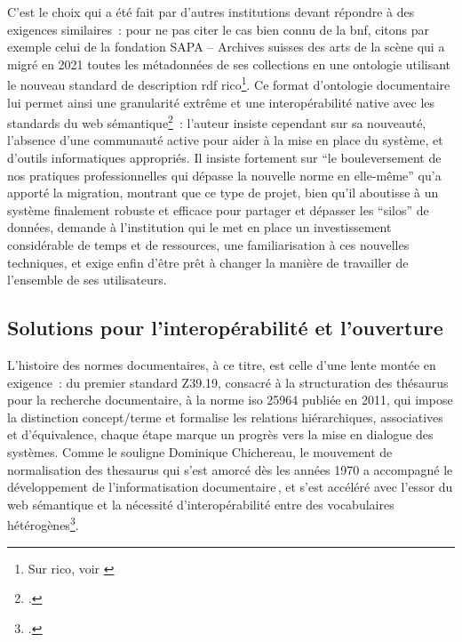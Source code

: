 C'est le choix qui a été fait par d'autres institutions devant répondre à des exigences similaires~: pour ne pas citer le cas bien connu de la \ac{bnf}, citons par exemple celui de la fondation SAPA -- Archives suisses des arts de la scène qui a migré en 2021 toutes les métadonnées de ses collections en une ontologie utilisant le nouveau standard de description \ac{rdf} \ac{rico}\footnote{Sur \ac{rico}, voir \cite{bruleauxRecordsContextsRIC2024}}. Ce format d'ontologie documentaire lui permet ainsi une granularité extrême et une interopérabilité native avec les standards du web sémantique\footcite{coulonDeploiementNormeRecords2024}~: l'auteur insiste cependant sur sa nouveauté, l'absence d'une communauté active pour aider à la mise en place du système, et d'outils informatiques appropriés. Il insiste fortement sur \enquote{le bouleversement de nos pratiques professionnelles qui dépasse la nouvelle norme en elle-même} qu'a apporté la migration, montrant que ce type de projet, bien qu'il aboutisse à un système finalement robuste et efficace pour partager et dépasser les \enquote{silos} de données, demande à l'institution qui le met en place un investissement considérable de temps et de ressources, une familiarisation à ces nouvelles techniques, et exige enfin d'être prêt à changer la manière de travailler de l'ensemble de ses utilisateurs.

\subsection{Solutions pour l’interopérabilité et l’ouverture}


L’histoire des normes documentaires, à ce titre, est celle d’une lente montée en exigence~: du premier standard Z39.19, consacré à la structuration des thésaurus pour la recherche documentaire, à la norme \gls{iso} 25964 publiée en 2011, qui impose la distinction concept/terme et formalise les relations hiérarchiques, associatives et d’équivalence, chaque étape marque un progrès vers la mise en dialogue des systèmes. Comme le souligne Dominique Chichereau, le mouvement de normalisation des \gls{thesaurus} qui s'est amorcé dès les années 1970 a accompagné le développement de l’informatisation documentaire , et s’est accéléré avec l’essor du web sémantique et la nécessité d'interopérabilité entre des vocabulaires hétérogènes\footcite{chichereauNormesConceptionGestion2007}.

